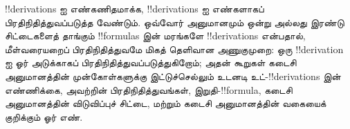 \documentclass[../../../include/open-logic-section]{subfiles}
\begin{document}


\begin{explain}
!!{derivation}s ஐ எண்கணிதமாக்க, !!{derivation}s ஐ எண்களாகப்
பிரதிநிதித்துவப்படுத்த வேண்டும். ஒவ்வோர் அனுமானமும் ஒன்று அல்லது இரண்டு
சிட்டைகளைத் தாங்கும் !!{formula}s இன் மரங்களே !!{derivation}s என்பதால்,
மீள்வரையறைப் பிரதிநிதித்துவமே மிகத் தெளிவான அணுகுமுறை: ஒரு
!!{derivation} ஐ ஓர் அடுக்காகப் பிரதிநிதித்துவப்படுத்துகிறோம்; அதன் கூறுகள்
கடைசி அனுமானத்தின் முன்கோள்களுக்கு இட்டுச்செல்லும் உடனடி
உட்-!!{derivation}s இன் எண்ணிக்கை, அவற்றின் பிரதிநிதித்துவங்கள்,
இறுதி-!!{formula}, கடைசி அனுமானத்தின் விடுவிப்புச் சிட்டை, மற்றும் கடைசி
அனுமானத்தின் வகையைக் குறிக்கும் ஓர் எண்.
\end{explain}
\end{document}
